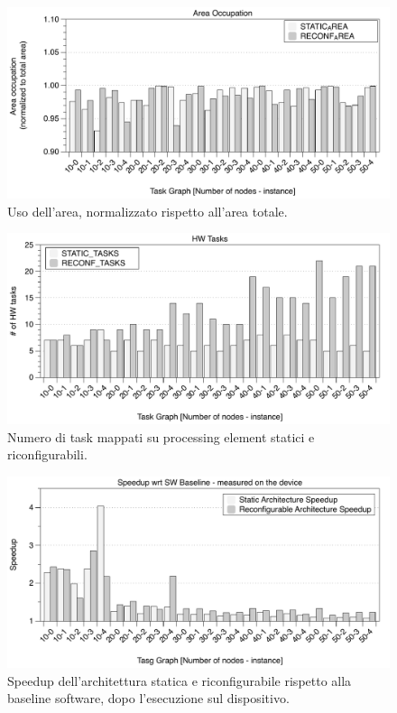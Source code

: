 \begin{figure}[t]
 \begin{center}
  \includegraphics[width=\textwidth]{./capitoli/figure/cap6/FPL_Area.pdf}
  \caption{Uso dell'area, normalizzato rispetto all'area totale.}
  \label{fig:usoArea}
 \end{center}
\end{figure}



\begin{figure}[t]
 \begin{center}
  \includegraphics[width=\textwidth]{./capitoli/figure/cap6/FPL_HWtasks.pdf}
  \caption{Numero di task mappati su processing element statici e riconfigurabili.}
  \label{fig:hardwareTask}
 \end{center}
\end{figure}


\begin{figure}[t]
 \begin{center}
  \includegraphics[width=\textwidth]{./capitoli/figure/cap6/FPL_Runtime.pdf}
  \caption{Speedup dell'architettura statica e riconfigurabile rispetto alla
  baseline software, dopo l'esecuzione sul dispositivo.}
  \label{fig:speedupBaselineRuntime}
 \end{center}
\end{figure}
